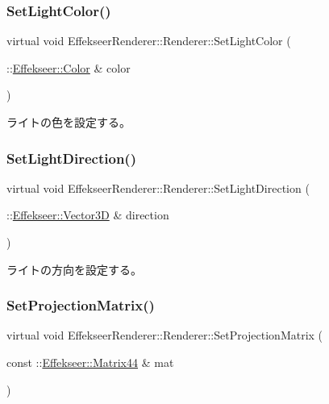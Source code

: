 \subsubsection{\texorpdfstring{Set\+Light\+Color()}{SetLightColor()}}
{\footnotesize\ttfamily virtual void Effekseer\+Renderer\+::\+Renderer\+::\+Set\+Light\+Color (\begin{DoxyParamCaption}\item[{\+::\mbox{\hyperlink{struct_effekseer_1_1_color}{Effekseer\+::\+Color}} \&}]{color }\end{DoxyParamCaption})\hspace{0.3cm}{\ttfamily [pure virtual]}}



ライトの色を設定する。 

\mbox{\label{class_effekseer_renderer_1_1_renderer_a28d4468e4a1ca40c585e7b6c88dd1849}} 
\subsubsection{\texorpdfstring{Set\+Light\+Direction()}{SetLightDirection()}}
{\footnotesize\ttfamily virtual void Effekseer\+Renderer\+::\+Renderer\+::\+Set\+Light\+Direction (\begin{DoxyParamCaption}\item[{\+::\mbox{\hyperlink{struct_effekseer_1_1_vector3_d}{Effekseer\+::\+Vector3D}} \&}]{direction }\end{DoxyParamCaption})\hspace{0.3cm}{\ttfamily [pure virtual]}}



ライトの方向を設定する。 

\mbox{\label{class_effekseer_renderer_1_1_renderer_a270c020aeb8cef8b0f1a9a02980d685d}} 
\subsubsection{\texorpdfstring{Set\+Projection\+Matrix()}{SetProjectionMatrix()}}
{\footnotesize\ttfamily virtual void Effekseer\+Renderer\+::\+Renderer\+::\+Set\+Projection\+Matrix (\begin{DoxyParamCaption}\item[{const \+::\mbox{\hyperlink{struct_effekseer_1_1_matrix44}{Effekseer\+::\+Matrix44}} \&}]{mat }\end{DoxyParamCaption})\hspace{0.3cm}{\ttfamily [pure virtual]}}



